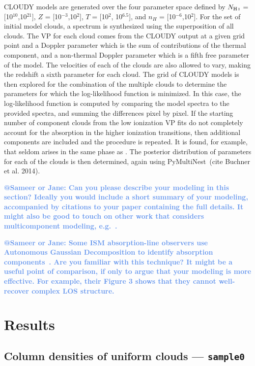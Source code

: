 \documentclass[fleqn,usenatbib]{mnras}
\makeatletter
\newcommand{\atsameer}[1]{\textcolor{CornflowerBlue}{\textbf{@Sameer or Jane: #1}}}
\makeatother
\begin{document}
CLOUDY models are generated over the four parameter space defined by $N_{\ion{H}{I}}$ = [10$^{10}$,10$^{21}$], $Z$ = [10$^{-3}$,10$^{2}$], $T$ = [10$^{2}$, 10$^{6.5}$], and $n_H$ = [10$^{-6}$,10$^{2}$].  For the set of initial model clouds, a spectrum is synthesized using the superposition of all clouds.  The VP for each cloud comes from the CLOUDY output at a given grid point and a Doppler parameter which is the sum of contributions of the thermal component, and a non-thermal Doppler parameter which is a fifth free parameter of the model. The velocities of each of the clouds are also allowed to vary, making the redshift a sixth parameter for each cloud.
The grid of CLOUDY models is then explored for the combination of the multiple clouds to determine the parameters for which the log-likelihood function is minimized. In this case, the log-likelihood function is computed by comparing the model spectra to the provided spectra, and summing the differences pixel by pixel.
If the starting number of component clouds from the low ionization VP fits do not completely account for the absorption in the higher ionization transitions, then additional components are included and the procedure is repeated. It is found, for example, that  seldom arises in the same phase as . The posterior distribution of parameters for each of the clouds is then determined, again using PyMultiNest~(cite Buchner et al. 2014).


\atsameer{
Can you please describe your modeling in this section?
Ideally you would include a short summary of your modeling, accompanied by citations to your paper containing the full details.
It might also be good to touch on other work that considers multicomponent modeling, e.g.~\cite{Liang2018}.
}

\atsameer{
Some ISM absorption-line observers use Autonomous Gaussian Decomposition to identify absorption components~\citep[e.g.][]{Murray2017}.
Are you familiar with this technique?
It might be a useful point of comparison, if only to argue that your modeling is more effective.
For example, their Figure 3 shows that they cannot well-recover complex LOS structure.
}

\section{Results}
\label{s: results}

\subsection{Column densities of uniform clouds --- \texttt{sample0}}
\label{s: results -- sample0}
\end{document}
